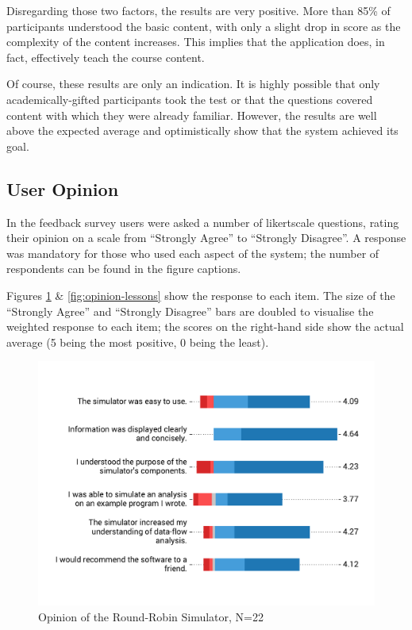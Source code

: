 \documentclass[bsc,twoside,singlespacing,parskip,logo,notimes,normalheadings]{infthesis}
\begin{document}
    Disregarding those two factors, the results are very
    positive. More than 85\% of participants understood the basic
    content, with only a slight drop in score as the complexity of the
    content increases. This implies that the application does, in
    fact, effectively teach the course content.

    Of course, these results are only an indication. It is highly
    possible that only academically-gifted participants took the
    test or that the questions covered content with which they were
    already familiar. However, the results are well above the expected
    average and optimistically show that the system achieved its goal.

    \subsection{User Opinion}

    In the feedback survey users were asked a number of
    \gls{likertscale} questions, rating their opinion on a scale from
    ``Strongly Agree'' to ``Strongly Disagree''. A response was
    mandatory for those who used each aspect of the system; the number
    of respondents can be found in the figure captions.

    Figures \ref{fig:opinion-simulator} \& \ref{fig:opinion-lessons}
    show the response to each item. The size of the ``Strongly Agree''
    and ``Strongly Disagree'' bars are doubled to visualise the
    weighted response to each item; the scores on the right-hand side
    show the actual average (5 being the most positive, 0 being the
    least).

    \begin{figure}[!hb]
      \centering
      \captionsetup{width=\textwidth, justification=centering}
      \caption{Opinion of the Round-Robin Simulator, N=22}\label{fig:opinion-simulator}
      \includegraphics[width=\textwidth, trim=0 40 0 40, clip]{img/simulator_opinion.pdf}
    \end{figure}
\end{document}
